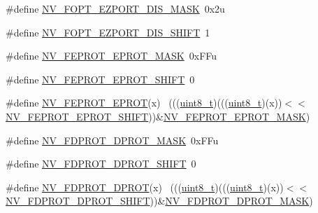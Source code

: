 \begin{DoxyCompactItemize}
\#define \hyperlink{group___n_v___register___masks_ga5c130a6f11de9f04a77b36fd61843e8f}{N\+V\+\_\+\+F\+O\+P\+T\+\_\+\+E\+Z\+P\+O\+R\+T\+\_\+\+D\+I\+S\+\_\+\+M\+A\+SK}~0x2u
\item 
\#define \hyperlink{group___n_v___register___masks_gabf1111ccacc4104b2855c4f3851cbaa5}{N\+V\+\_\+\+F\+O\+P\+T\+\_\+\+E\+Z\+P\+O\+R\+T\+\_\+\+D\+I\+S\+\_\+\+S\+H\+I\+FT}~1
\item 
\#define \hyperlink{group___n_v___register___masks_gae309f9fbc7ce46321fbe34e89077fd7a}{N\+V\+\_\+\+F\+E\+P\+R\+O\+T\+\_\+\+E\+P\+R\+O\+T\+\_\+\+M\+A\+SK}~0x\+F\+Fu
\item 
\#define \hyperlink{group___n_v___register___masks_gad725c7b093dfd814cfae3e3fe8522ed2}{N\+V\+\_\+\+F\+E\+P\+R\+O\+T\+\_\+\+E\+P\+R\+O\+T\+\_\+\+S\+H\+I\+FT}~0
\item 
\#define \hyperlink{group___n_v___register___masks_gabcc836b96405f4caaf42e866658a0ff6}{N\+V\+\_\+\+F\+E\+P\+R\+O\+T\+\_\+\+E\+P\+R\+OT}(x)                                          ~(((\hyperlink{_p_e___types_8h_aba7bc1797add20fe3efdf37ced1182c5}{uint8\+\_\+t})(((\hyperlink{_p_e___types_8h_aba7bc1797add20fe3efdf37ced1182c5}{uint8\+\_\+t})(x))$<$$<$\hyperlink{group___n_v___register___masks_gad725c7b093dfd814cfae3e3fe8522ed2}{N\+V\+\_\+\+F\+E\+P\+R\+O\+T\+\_\+\+E\+P\+R\+O\+T\+\_\+\+S\+H\+I\+FT}))\&\hyperlink{group___n_v___register___masks_gae309f9fbc7ce46321fbe34e89077fd7a}{N\+V\+\_\+\+F\+E\+P\+R\+O\+T\+\_\+\+E\+P\+R\+O\+T\+\_\+\+M\+A\+SK})
\item 
\#define \hyperlink{group___n_v___register___masks_ga004ff32c4f18a922a47aaf9adea14d41}{N\+V\+\_\+\+F\+D\+P\+R\+O\+T\+\_\+\+D\+P\+R\+O\+T\+\_\+\+M\+A\+SK}~0x\+F\+Fu
\item 
\#define \hyperlink{group___n_v___register___masks_gaf2019bf7c0b8e9dc5efcc385cc50f35b}{N\+V\+\_\+\+F\+D\+P\+R\+O\+T\+\_\+\+D\+P\+R\+O\+T\+\_\+\+S\+H\+I\+FT}~0
\item 
\#define \hyperlink{group___n_v___register___masks_gaf8d86f0c12ae901350923c42b1c0dbbe}{N\+V\+\_\+\+F\+D\+P\+R\+O\+T\+\_\+\+D\+P\+R\+OT}(x)                                          ~(((\hyperlink{_p_e___types_8h_aba7bc1797add20fe3efdf37ced1182c5}{uint8\+\_\+t})(((\hyperlink{_p_e___types_8h_aba7bc1797add20fe3efdf37ced1182c5}{uint8\+\_\+t})(x))$<$$<$\hyperlink{group___n_v___register___masks_gaf2019bf7c0b8e9dc5efcc385cc50f35b}{N\+V\+\_\+\+F\+D\+P\+R\+O\+T\+\_\+\+D\+P\+R\+O\+T\+\_\+\+S\+H\+I\+FT}))\&\hyperlink{group___n_v___register___masks_ga004ff32c4f18a922a47aaf9adea14d41}{N\+V\+\_\+\+F\+D\+P\+R\+O\+T\+\_\+\+D\+P\+R\+O\+T\+\_\+\+M\+A\+SK})

\end{DoxyCompactItemize}
